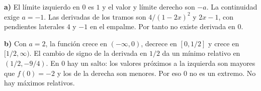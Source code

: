 \textbf{a)} El límite izquierdo en $0$ es $1$ y el valor
y límite derecho son $-a$. La continuidad exige $\boxed{a=-1}$.
Las derivadas de los tramos son $4/(1-2x)^2$ y $2x-1$,
con pendientes laterales $4$ y $-1$ en el empalme.
Por tanto no existe derivada en $0$.

\textbf{b)} Con $a=2$, la función crece en $(-\infty,0)$,
decrece en $[0,1/2]$ y crece en $[1/2,\infty)$.
El cambio de signo de la derivada en $1/2$ da un mínimo
relativo en $\boxed{(1/2,-9/4)}$.
En $0$ hay un salto: los valores próximos a la izquierda
son mayores que $f(0)=-2$ y los de la derecha son menores.
Por eso $0$ no es un extremo. No hay máximos relativos.
